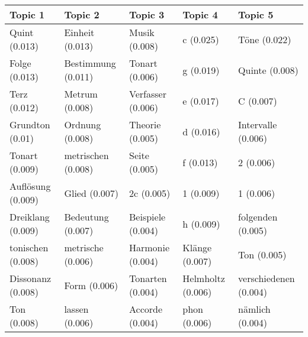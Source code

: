 \begin{tabular}{lllll}
\toprule
          Topic 1 &            Topic 2 &           Topic 3 &           Topic 4 &               Topic 5 \\
\midrule
    Quint (0.013) &    Einheit (0.013) &     Musik (0.008) &         c (0.025) &          Töne (0.022) \\
    Folge (0.013) & Bestimmung (0.011) &    Tonart (0.006) &         g (0.019) &        Quinte (0.008) \\
     Terz (0.012) &     Metrum (0.008) & Verfasser (0.006) &         e (0.017) &             C (0.007) \\
  Grundton (0.01) &    Ordnung (0.008) &   Theorie (0.005) &         d (0.016) &    Intervalle (0.006) \\
   Tonart (0.009) & metrischen (0.008) &     Seite (0.005) &         f (0.013) &             2 (0.006) \\
Auflösung (0.009) &      Glied (0.007) &        2c (0.005) &         1 (0.009) &             1 (0.006) \\
Dreiklang (0.009) &  Bedeutung (0.007) & Beispiele (0.004) &         h (0.009) &     folgenden (0.005) \\
tonischen (0.008) &  metrische (0.006) &  Harmonie (0.004) &    Klänge (0.007) &           Ton (0.005) \\
Dissonanz (0.008) &       Form (0.006) &  Tonarten (0.004) & Helmholtz (0.006) & verschiedenen (0.004) \\
      Ton (0.008) &     lassen (0.006) &   Accorde (0.004) &      phon (0.006) &       nämlich (0.004) \\
\bottomrule
\end{tabular}
